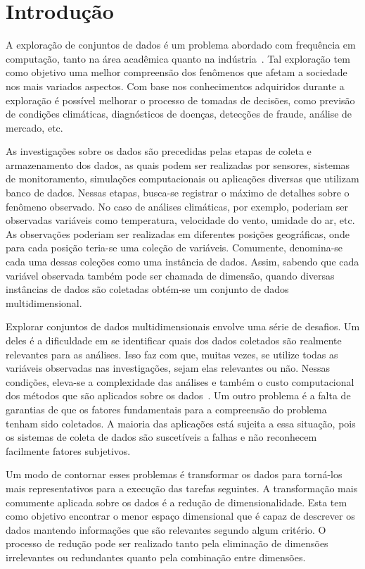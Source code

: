 \chapter{Introdução}

A exploração de conjuntos de dados é um problema abordado
com frequência em computação, tanto na área acadêmica quanto
na indústria~\cite{Ngai2009,Harding2006}. Tal exploração tem
como objetivo uma melhor compreensão dos fenômenos que
afetam a sociedade nos mais variados aspectos. Com base nos
conhecimentos adquiridos durante a exploração é possível 
melhorar o processo de tomadas de decisões, como
previsão de condições climáticas, diagnósticos de doenças,
detecções de fraude, análise de mercado, etc.

As investigações sobre os dados são precedidas pelas etapas
de coleta e armazenamento dos dados, as quais podem ser
realizadas por sensores, sistemas de monitoramento,
simulações computacionais ou aplicações diversas que
utilizam banco de dados. Nessas etapas, busca-se registrar o
máximo de detalhes sobre o fenômeno observado. No caso de
análises climáticas, por exemplo, poderiam ser observadas
variáveis como temperatura, velocidade do vento, umidade do
ar, etc. As observações poderiam ser realizadas em
diferentes posições geográficas, onde para cada posição
teria-se uma coleção de variáveis. Comumente, denomina-se
cada uma dessas coleções como uma instância de dados.
Assim, sabendo que cada variável observada também pode ser
chamada de dimensão, quando diversas instâncias de dados são
coletadas obtém-se um conjunto de dados multidimensional. 

Explorar conjuntos de dados multidimensionais envolve uma
série de desafios. Um deles é a dificuldade em se
identificar quais dos dados coletados são realmente
relevantes para as análises. Isso faz com que, muitas vezes,
se utilize todas as variáveis observadas nas investigações,
sejam elas relevantes ou não. Nessas condições, eleva-se a
complexidade das análises e também o custo computacional dos
métodos que são aplicados sobre os dados~\cite{Beyer1999}.
Um outro problema é a falta de garantias de que os fatores
fundamentais para a compreensão do problema tenham sido
coletados. A maioria das aplicações está sujeita a essa
situação, pois os sistemas de coleta de dados são
suscetíveis a falhas e não reconhecem facilmente fatores
subjetivos. 

Um modo de contornar esses problemas é transformar os dados
para torná-los mais representativos para a execução das
tarefas seguintes. A transformação mais comumente aplicada
sobre os dados é a redução de dimensionalidade. Esta tem
como objetivo encontrar o menor espaço dimensional que é
capaz de descrever os dados mantendo informações que são
relevantes segundo algum critério. O processo de redução
pode ser realizado tanto pela eliminação de dimensões
irrelevantes ou redundantes quanto pela combinação entre
dimensões. 

